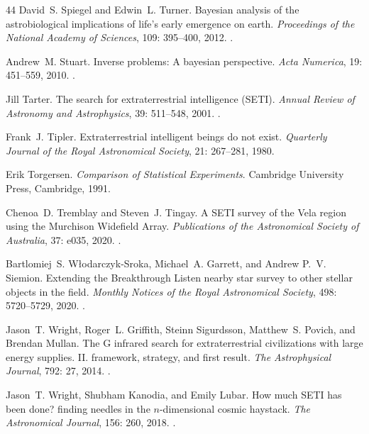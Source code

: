 \documentclass[11pt,a4paper]{article}
\begin{document}
\begin{thebibliography}{44}
David~S. Spiegel and Edwin~L. Turner.
\newblock Bayesian analysis of the astrobiological implications of life's early
  emergence on earth.
\newblock \emph{Proceedings of the National Academy of Sciences}, 109:
  395--400, 2012.
\newblock {}.

Andrew~M. Stuart.
\newblock Inverse problems: A bayesian perspective.
\newblock \emph{Acta Numerica}, 19: 451--559, 2010.
\newblock {}.

Jill Tarter.
\newblock The search for extraterrestrial intelligence ({SETI}).
\newblock \emph{Annual Review of Astronomy and Astrophysics}, 39:
  511--548, 2001.
\newblock {}.

Frank~J. Tipler.
\newblock Extraterrestrial intelligent beings do not exist.
\newblock \emph{Quarterly Journal of the Royal Astronomical Society},
  21: 267--281, 1980.

Erik Torgersen.
\newblock \emph{Comparison of Statistical Experiments}.
\newblock Cambridge University Press, Cambridge, 1991.

Chenoa~D. Tremblay and Steven~J. Tingay.
\newblock A {SETI} survey of the {Vela} region using the {Murchison Widefield
  Array}.
\newblock \emph{Publications of the Astronomical Society of Australia},
  37: e035, 2020.
\newblock {}.

Bartlomiej~S. {W{\l}odarczyk-Sroka}, Michael~A. Garrett, and Andrew P.~V.
  Siemion.
\newblock Extending the {Breakthrough Listen} nearby star survey to other
  stellar objects in the field.
\newblock \emph{Monthly Notices of the Royal Astronomical Society},
  498: 5720--5729, 2020.
\newblock {}.

Jason~T. Wright, Roger~L. Griffith, Steinn Sigurdsson, Matthew~S. Povich, and
  Brendan Mullan.
\newblock The {G} infrared search for extraterrestrial civilizations with large
  energy supplies. {II}. framework, strategy, and first result.
\newblock \emph{The Astrophysical Journal}, 792: 27, 2014.
\newblock {}.

Jason~T. Wright, Shubham Kanodia, and Emily Lubar.
\newblock How much {SETI} has been done? finding needles in the $n$-dimensional
  cosmic haystack.
\newblock \emph{The Astronomical Journal}, 156: 260, 2018.
\newblock {}.

\end{thebibliography}
\end{document}
